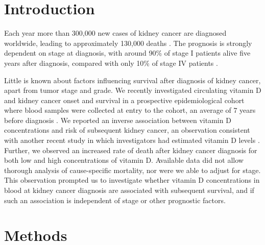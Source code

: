 \documentclass[a4paper,11pt]{article}
\renewcommand{\cite}{\citep}
\begin{document}
\clearpage


\section*{Introduction}
Each year more than 300,000 new cases of kidney cancer are diagnosed worldwide, 
leading to approximately 130,000 deaths \cite{ferlay_cancer_2013}. The prognosis 
is strongly dependent on stage at diagnosis, with around 90\% of stage I 
patients alive five years after diagnosis, compared with only 10\% of stage IV 
patients \cite{CRUK_kidney_2014}.

Little is known about factors influencing survival after diagnosis of kidney 
cancer, apart from tumor stage and grade. We recently investigated circulating 
vitamin D and kidney cancer onset and survival in a prospective epidemiological 
cohort where blood samples were collected at entry to the cohort, an average 
of 7 years before diagnosis \cite{muller_circulating_2014}. We reported an 
inverse association between vitamin D concentrations and risk of subsequent 
kidney cancer, an observation consistent with another recent study in which 
investigators had estimated vitamin D levels \cite{joh_predicted_2013}. 
Further, we observed an increased rate of death after kidney cancer diagnosis 
for both low and high concentrations of vitamin D. Available data did not allow 
thorough analysis of cause-specific mortality, nor were we able to adjust for 
stage. This observation prompted us to investigate whether vitamin D 
concentrations in blood at kidney cancer diagnosis are associated with 
subsequent survival, and if such an association is independent of stage or 
other prognostic factors.   

\section*{Methods}
\end{document}
